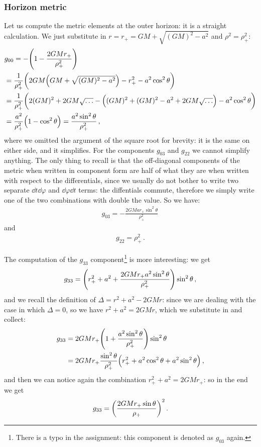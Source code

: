 \documentclass[main.tex]{subfiles}
\begin{document}
\subsubsection{Horizon metric}

Let us compute the metric elements at the outer horizon: it is a straight calculation. We just substitute in \(r = r_{+} = GM + \sqrt{(GM)^2 - a^2}\) and \(\rho^2 = \rho^2_{+}\): 
%
\begin{subequations}
\begin{align}
  &g_{00}  = - \qty(1 - \frac{2GMr_{+}}{\rho_{+}^2})  \\
  &= \frac{1}{\rho_{+}^2} \qty(2GM \qty(GM + \sqrt{(GM)^2 - a^2}) - r_{+}^2 - a^2 \cos^2\theta )  \\
  &= \frac{1}{\rho_{+}^2} \qty( 2 (GM)^2 + 2GM \sqrt{\dots}- \qty((GM)^2 + (GM)^2 -a^2 + 2GM \sqrt{\dots}) - a^2 \cos^2 \theta )  \\
  &= \frac{a^2}{\rho_{+}^2}  \qty(1 - \cos^2 \theta ) = \frac{a^2 \sin^2\theta}{\rho_{+}^2}
\,,
\end{align}
\end{subequations}
%
where we omitted the argument of the square root for brevity: it is the same on either side, and it simplifies. 
For the components \(g_{03}\) and \(g_{22} \) we cannot simplify anything. The  only thing to recall is that the off-diagonal components of the metric when written in component form are half of what they are when written with respect to the differentials, since we usually do not bother to write two separate \(\dd{t} \dd{\varphi }\) and \(\dd{\varphi } \dd{t}\) terms: the diffentials commute, therefore we simply write one of the two combinations with double the value. So we have: 
%
\begin{align}
  g_{03} = -\frac{2GMa r_+ \sin^2\theta }{\rho_{+}^2}
\,
\end{align}
and 
%
\begin{align}
  g_{22} = \rho_{+}^2
\,.
\end{align}

The computation of the \(g_{33} \) component\footnote{There is a typo in the assignment: this component is denoted as \(g_{03}\) again.} is more interesting: we get 
%
\begin{align}
  g_{33} = \qty( r_+^2 + a^2 + \frac{2GMr_{+} a^2 \sin^2\theta }{\rho_{+}^2}) \sin^2 \theta 
\,,
\end{align}
%
and we recall the definition of \(\Delta = r^2 + a^2 - 2GM r\): since we are dealing with the case in which \(\Delta = 0\), so we have \(r^2 + a^2 = 2GMr\), which we substitute in and collect:
%
\begin{align}
  g_{33} &= 2GMr_{+} \qty(1 + \frac{a^2 \sin^2\theta }{\rho_{+}^2}) \sin^2\theta \\
  &= 2GMr_{+} \frac{\sin^2 \theta }{\rho_{+}^2} \qty(r_{+}^2 + a^2 \cos^2 \theta + a^2 \sin^2\theta )
\,,
\end{align}
%
and then we can notice again the combination \(r_{+}^2 + a^2 = 2GMr_{+}\): so in the end we get 
%
\begin{align}
  g_{33} = \qty(\frac{2GMr_{+} \sin \theta }{\rho_{+}})^2
\,.
\end{align}
\end{document}
